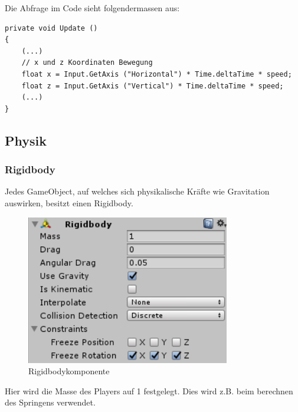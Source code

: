 Die Abfrage im Code sieht folgendermassen aus:

\begin{lstlisting}[caption={Abfrage der X- und Z-Achsen im Code}]
private void Update ()
{
	(...)
	// x und z Koordinaten Bewegung
	float x = Input.GetAxis ("Horizontal") * Time.deltaTime * speed;
	float z = Input.GetAxis ("Vertical") * Time.deltaTime * speed;
	(...)
}      
\end{lstlisting}

\subsection{Physik}

\subsubsection{Rigidbody}
Jedes GameObject, auf welches sich physikalische Kräfte wie Gravitation auswirken, besitzt einen Rigidbody.
\begin{figure}[H]
\includegraphics[scale=0.8]{screenshots/rigidbody.png}
\caption{Rigidbodykomponente}
\end{figure}
Hier wird die Masse des Players auf 1 festgelegt. Dies wird z.B. beim berechnen des Springens verwendet.


